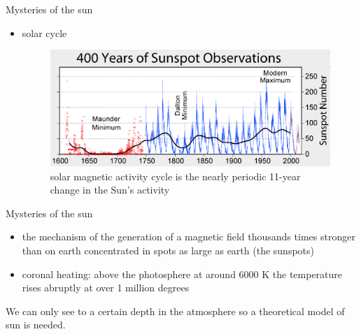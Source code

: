\documentclass{beamer}
\begin{document}
\begin{frame}{Mysteries of the sun}
\begin{itemize}
\item solar cycle
\begin{figure}[H]
 \centering
 \includegraphics[scale=0.4]{cycle.png}
  \caption{solar magnetic activity cycle is the nearly periodic 11-year change in the Sun's activity}
\end{figure}
\end{itemize}
\end{frame}



\begin{frame}{Mysteries of the sun}

\begin{itemize}
\item the mechanism of the generation of 
a magnetic field thousands times stronger 
than on earth concentrated in spots as large as earth (the sunspots)
\item coronal heating: above the photosphere at around 6000 K the temperature rises abruptly at over 1 million degrees 
\end{itemize}

We can only see to a certain depth in the atmosphere so a theoretical model of  sun is needed.

\end{frame}
\end{document}
